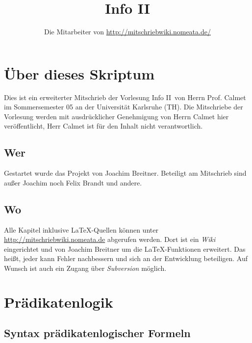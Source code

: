 \documentclass[a4paper,twoside,DIV15,BCOR12mm]{scrbook}
\author{Die Mitarbeiter von \url{http://mitschriebwiki.nomeata.de/}}
\title{Info II}
\begin{document}
\maketitle

\renewcommand{\thechapter}{\Roman{chapter}}
\tableofcontents


\chapter{Über dieses Skriptum}
Dies ist ein erweiterter Mitschrieb der Vorlesung \glqq Info II\grqq\ von Herrn Prof. Calmet im
Sommersemester 05 an der Universität Karlsruhe (TH).
Die Mitschriebe der Vorlesung werden mit ausdrücklicher Genehmigung von Herrn Calmet hier veröffentlicht,
Herr Calmet ist für den Inhalt nicht verantwortlich.

\section{Wer}
Gestartet wurde das Projekt von Joachim Breitner. Beteiligt am Mitschrieb sind außer Joachim noch Felix Brandt und andere.

\section{Wo}
Alle Kapitel inklusive \LaTeX-Quellen können unter \url{http://mitschriebwiki.nomeata.de} abgerufen werden.
Dort ist ein \emph{Wiki} eingerichtet und von Joachim Breitner um die \LaTeX-Funktionen erweitert.
Das heißt, jeder kann Fehler nachbessern und sich an der Entwicklung
beteiligen. Auf Wunsch ist auch ein Zugang über \emph{Subversion} möglich.



\chapter{Prädikatenlogik}

\section{Syntax prädikatenlogischer Formeln}
\end{document}
